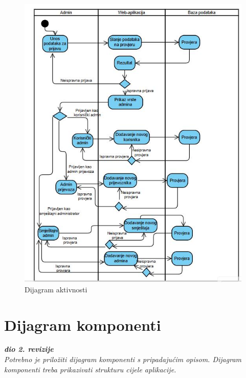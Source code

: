 		\begin{figure}[H]
			\includegraphics[width=\linewidth]{slike/Dijagram aktivnsti.JPG}
			\centering
			\caption{Dijagram aktivnosti}
			\label{fig:Dijagram aktivnosti}
		\end{figure}


			\eject
		\section{Dijagram komponenti}
		
			\textbf{\textit{dio 2. revizije}}\\
		
			 \textit{Potrebno je priložiti dijagram komponenti s pripadajućim opisom. Dijagram komponenti treba prikazivati strukturu cijele aplikacije.}